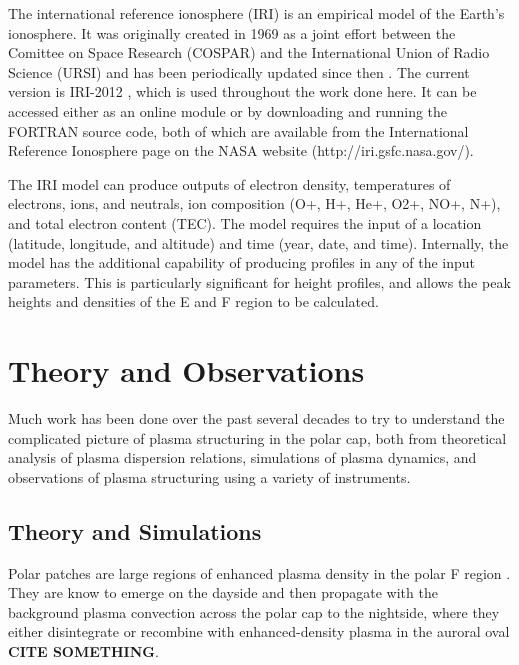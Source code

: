 The international reference ionosphere (IRI) is an empirical model of the Earth's ionosphere.  It was originally created in 1969 as a joint effort between the Comittee on Space Research (COSPAR) and the International Union of Radio Science (URSI) and has been periodically updated since then \citep{Rawer1978}.  The current version is IRI-2012 \citep{Bilitza2014}, which is used throughout the work done here.  It can be accessed either as an online module or by downloading and running the FORTRAN source code, both of which are available from the International Reference Ionosphere page on the NASA website (http://iri.gsfc.nasa.gov/).

The IRI model can produce outputs of electron density, temperatures of electrons, ions, and neutrals, ion composition (O+, H+, He+, O2+, NO+, N+), and total electron content (TEC).  The model requires the input of a location (latitude, longitude, and altitude) and time (year, date, and time).  Internally, the model has the additional capability of producing profiles in any of the input parameters.  This is particularly significant for height profiles, and allows the peak heights and densities of the E and F region to be calculated.


\section{Theory and Observations}
Much work has been done over the past several decades to try to understand the complicated picture of plasma structuring in the polar cap, both from theoretical analysis of plasma dispersion relations, simulations of plasma dynamics, and observations of plasma structuring using a variety of instruments.

\subsection{Theory and Simulations}

Polar patches are large regions of enhanced plasma density in the polar F region \citep[][e.g.]{Weber1984,Buchau1983}.  They are know to emerge on the dayside and then propagate with the background plasma convection across the polar cap to the nightside, where they either disintegrate or recombine with enhanced-density plasma in the auroral oval \textbf{CITE SOMETHING}.


